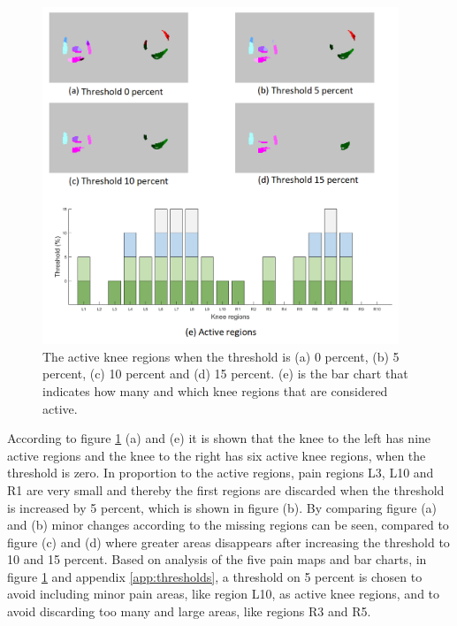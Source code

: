 \begin{figure} [H]
\centering
\includegraphics[width=0.95\textwidth]{figures/threshold4}
\caption{The active knee regions when the threshold is (a) 0 percent, (b) 5 percent, (c) 10 percent and (d) 15 percent. (e) is the bar chart that indicates how many and which knee regions that are considered active.}
\label{fig:threshold}
\end{figure}

\noindent
According to figure \ref{fig:threshold} (a) and (e) it is shown that the knee to the left has nine active regions and the knee to the right has six active knee regions, when the threshold is zero. In proportion to the active regions, pain regions L3, L10 and R1 are very small and thereby the first regions are discarded when the threshold is increased by 5 percent, which is shown in figure (b).
By comparing figure (a) and (b) minor changes according to the missing regions can be seen, compared to figure (c) and (d) where greater areas disappears after increasing the threshold to 10 and 15 percent.
\noindent
Based on analysis of the five pain maps and bar charts, in figure \ref{fig:threshold} and appendix \ref{app:thresholds}, a threshold on 5 percent is chosen to avoid including minor pain areas, like region L10, as active knee regions, and to avoid discarding too many and large areas, like regions R3 and R5.


